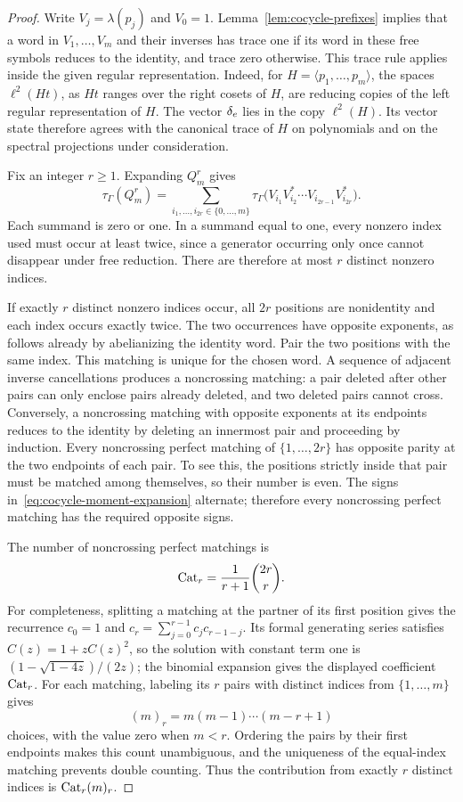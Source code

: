 \begin{proof}
Write $V_j=\lambda(p_j)$ and $V_0=1$.
Lemma~\ref{lem:cocycle-prefixes} implies that a word in
$V_1,\ldots,V_m$ and their inverses has trace one if its word in
these free symbols reduces to the identity, and trace zero
otherwise.
This trace rule applies inside the given regular representation.
Indeed, for $H=\langle p_1,\ldots,p_m\rangle$, the spaces
$\ell^2(Ht)$, as $Ht$ ranges over the right cosets of $H$, are
reducing copies of the left regular representation of $H$.
The vector $\delta_e$ lies in the copy $\ell^2(H)$.
Its vector state therefore agrees with the canonical trace of
$H$ on polynomials and on the spectral projections under
consideration.

Fix an integer $r\geq 1$.  Expanding $Q_m^r$ gives
\begin{equation}
\label{eq:cocycle-moment-expansion}
  \tau_\Gamma(Q_m^r)
  =\sum_{i_1,\ldots,i_{2r}\in\{0,\ldots,m\}}
    \tau_\Gamma\bigl(
      V_{i_1}V_{i_2}^*\cdots V_{i_{2r-1}}V_{i_{2r}}^*
    \bigr).
\end{equation}
Each summand is zero or one.  In a summand equal to one, every
nonzero index used must occur at least twice, since a generator
occurring only once cannot disappear under free reduction.
There are therefore at most $r$ distinct nonzero indices.

If exactly $r$ distinct nonzero indices occur, all $2r$ positions
are nonidentity and each index occurs exactly twice.
The two occurrences have opposite exponents, as follows already
by abelianizing the identity word.
Pair the two positions with the same index.  This matching is
unique for the chosen word.
A sequence of adjacent inverse cancellations produces a
noncrossing matching: a pair deleted after other pairs can only
enclose pairs already deleted, and two deleted pairs cannot
cross.
Conversely, a noncrossing matching with opposite exponents at
its endpoints reduces to the identity by deleting an innermost
pair and proceeding by induction.
Every noncrossing perfect matching of $\{1,\ldots,2r\}$ has
opposite parity at the two endpoints of each pair.  To see this,
the positions strictly inside that pair must be matched among
themselves, so their number is even.
The signs in~\eqref{eq:cocycle-moment-expansion} alternate;
therefore every noncrossing perfect matching has the required
opposite signs.

The number of noncrossing perfect matchings is
\[
  \operatorname{Cat}_r=\frac{1}{r+1}\binom{2r}{r}.
\]
For completeness, splitting a matching at the partner of its
first position gives the recurrence
$c_0=1$ and $c_r=\sum_{j=0}^{r-1}c_jc_{r-1-j}$.
Its formal generating series satisfies $C(z)=1+zC(z)^2$,
so the solution with constant term one is
$(1-\sqrt{1-4z})/(2z)$; the binomial expansion gives the displayed
coefficient $\operatorname{Cat}_r$.
For each matching, labeling its $r$ pairs with distinct indices
from $\{1,\ldots,m\}$ gives
\[
  (m)_r=m(m-1)\cdots(m-r+1)
\]
choices, with the value zero when $m<r$.
Ordering the pairs by their first endpoints makes this count
unambiguous, and the uniqueness of the equal-index matching
prevents double counting.
Thus the contribution from exactly $r$ distinct indices is
$\operatorname{Cat}_r(m)_r$.


\end{proof}
